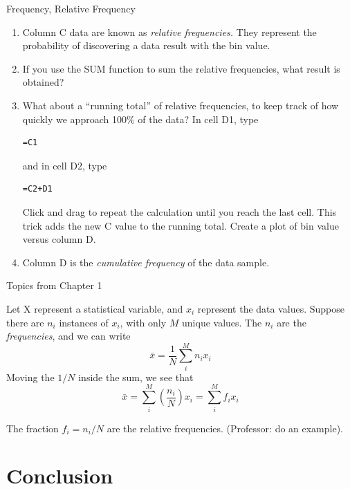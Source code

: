 \documentclass{beamer}
\begin{document}
\begin{frame}[fragile]{Frequency, Relative Frequency}
\small
\begin{enumerate}
\item Column C data are known as \textit{relative frequencies.}  They represent the probability of discovering a data result with the bin value.
\item If you use the SUM function to sum the relative frequencies, what result is obtained?
\item What about a ``running total'' of relative frequencies, to keep track of how quickly we approach 100\% of the data?  In cell D1, type
\begin{verbatim}
=C1
\end{verbatim} 
and in cell D2, type
\begin{verbatim}
=C2+D1
\end{verbatim}
Click and drag to repeat the calculation until you reach the last cell.  This trick adds the new C value to the running total. Create a plot of bin value versus column D.
\item Column D is the \textit{cumulative frequency} of the data sample.
\end{enumerate}
\end{frame}

\begin{frame}{Topics from Chapter 1}
\begin{tcolorbox}[colback=orange!10,colframe=orange!100,title=Mean: Definition 2]
Let X represent a statistical variable, and $x_i$ represent the data values.  Suppose there are $n_i$ instances of $x_i$, with only $M$ unique values.  The $n_i$ are the \textit{frequencies}, and we can write
\begin{equation}
\bar{x} = \frac{1}{N}\sum_i^{M} n_i x_i
\end{equation}
Moving the $1/N$ inside the sum, we see that
\begin{equation}
\bar{x} = \sum_i^{M} \left(\frac{n_i}{N}\right) x_i = \sum_i^{M} f_i x_i
\end{equation}
\end{tcolorbox}
The fraction $f_i = n_i/N$ are the relative frequencies.  (Professor: do an example).
\end{frame}

\section{Conclusion}
\end{document}

